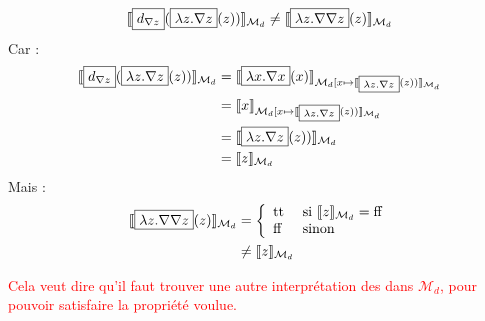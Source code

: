 \documentclass[12pt]{article}
\newcommand{\false}{\textup{ff}}
\newcommand{\true}{\textup{tt}}
\newcommand{\M}{\ensuremath{\mathcal{M}}}
\newcommand{\I}{\ensuremath{\mathcal{I}}}
\newcommand{\raph}[1]{\textcolor{red}{#1}}
\begin{document}
\[ \llbracket \framebox{$d_{\nabla z}$}(\framebox{$\lambda z . \nabla z$}(z)) \rrbracket_{\M_d}
  \neq
  \llbracket \framebox{$\lambda z . \nabla \nabla z$}(z) \rrbracket_{\M_d} \]
Car :
\begin{align*}
  \llbracket \framebox{$d_{\nabla z}$}(\framebox{$\lambda z . \nabla z$}(z)) \rrbracket_{\M_d}
  &= \llbracket \framebox{$\lambda x . \nabla x$}(x) \rrbracket_{\M_d[x \mapsto \llbracket \framebox{${}_{\lambda z . \nabla z}$}(z)) \rrbracket_{\M_d}} \\
  &= \llbracket x \rrbracket_{\M_d[x \mapsto \llbracket \framebox{${}_{\lambda z . \nabla z}$}(z)) \rrbracket_{\M_d}} \\
  &= \llbracket \framebox{${\lambda z . \nabla z}$}(z)) \rrbracket_{\M_d} \\
  &= \llbracket z \rrbracket_{\M_d}
\end{align*}
Mais :
\begin{align*}
  \llbracket \framebox{$\lambda z . \nabla \nabla z$}(z) \rrbracket_{\M_d}
  &= \left \{
    \begin{array}{l l}
      \true & \textup{ si } \llbracket z \rrbracket_{\M_d} = \false \\
      \false & \textup{ sinon }
    \end{array}
               \right . \\
  &\neq \llbracket z \rrbracket_{\M_d}               
\end{align*}

\raph{%
  Cela veut dire qu'il faut trouver une autre interprétation des \framebox{$d_{\vec{\epsilon}}$} dans $\M_d$, pour pouvoir satisfaire la propriété voulue.}
\end{document}
